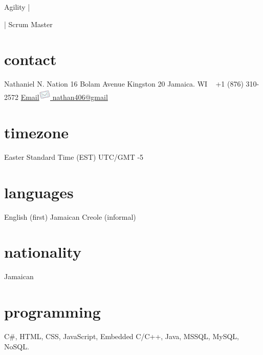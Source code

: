 \documentclass[]{friggeri-cvRS}
\begin{document}
	{Agility |  | Scrum Master}



\begin{aside}
  \section{contact}
    Nathaniel N. Nation
   16 Bolam Avenue
   Kingston 20
    Jamaica. WI
    ~
    +1 (876) 310-2572
    \href{mailto:nathan406@gmail.com}{Email\includegraphics[height=16pt]{images/email.png}
    nathan406@gmail}
    \section{timezone}
    Easter Standard Time (EST)
    UTC/GMT -5
    \section{languages}
    English (first)
    Jamaican Creole (informal)
    \section{nationality}
    Jamaican
    \section{programming}
     C\#, HTML, CSS, JavaScript, Embedded C/C++, Java, MSSQL, MySQL, NoSQL.
\end{aside}
\end{document}
